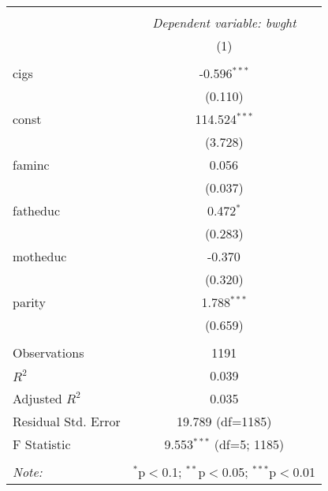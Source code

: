\begin{table}[!htbp] \centering
\begin{tabular}{@{\extracolsep{5pt}}lc}
\\[-1.8ex]\hline
\hline \\[-1.8ex]
& \multicolumn{1}{c}{\textit{Dependent variable: bwght}} \
\cr \cline{2-2}
\\[-1.8ex] & (1) \\
\hline \\[-1.8ex]
 cigs & -0.596$^{***}$ \\
& (0.110) \\
 const & 114.524$^{***}$ \\
& (3.728) \\
 faminc & 0.056$^{}$ \\
& (0.037) \\
 fatheduc & 0.472$^{*}$ \\
& (0.283) \\
 motheduc & -0.370$^{}$ \\
& (0.320) \\
 parity & 1.788$^{***}$ \\
& (0.659) \\
\hline \\[-1.8ex]
 Observations & 1191 \\
 $R^2$ & 0.039 \\
 Adjusted $R^2$ & 0.035 \\
 Residual Std. Error & 19.789 (df=1185) \\
 F Statistic & 9.553$^{***}$ (df=5; 1185) \\
\hline
\hline \\[-1.8ex]
\textit{Note:} & \multicolumn{1}{r}{$^{*}$p$<$0.1; $^{**}$p$<$0.05; $^{***}$p$<$0.01} \\
\end{tabular}
\end{table}